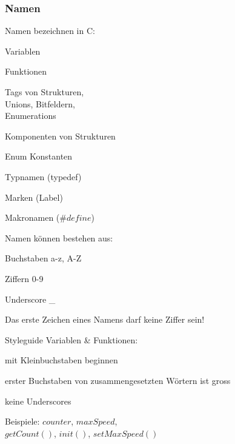  		\subsubsection{Namen }
 			\begin{minipage}[t]{5 cm}
 				Namen bezeichnen in C:
 				\begin{compactitem}
					\item Variablen
					\item Funktionen
					\item Tags von Strukturen, \\Unions, Bitfeldern, \\Enumerations
					\item Komponenten von Strukturen
					\item Enum Konstanten
					\item Typnamen (typedef)
					\item Marken (Label)
					\item Makronamen ($\#define$)
 				\end{compactitem}
 			\end{minipage}
 			\hspace*{1.0cm}
 			\begin{minipage}[t]{5 cm}
	 			Namen können bestehen aus:
	 			\begin{compactitem}
					\item Buchstaben a-z, A-Z
					\item Ziffern 0-9
					\item Underscore \_
	 			\end{compactitem}
	 			\vspace*{0.2cm} 
	 			Das erste Zeichen eines Namens darf keine Ziffer sein!
	 		\end{minipage}
	 		\hspace*{1.0cm}
	 		\begin{minipage}[t]{6 cm}
		 		Styleguide Variablen \& Funktionen:
		 		\begin{compactitem}
		 			\item mit Kleinbuchstaben beginnen	 			
		 			\item erster Buchstaben von zusammengesetzten Wörtern ist gross	
		 			\item keine Underscores
		 		\end{compactitem}
		 		\vspace*{0.2cm} 
		 		Beispiele: $counter$, $maxSpeed$, \\$getCount()$, $init()$, $setMaxSpeed()$	
	 		\end{minipage}	
		
